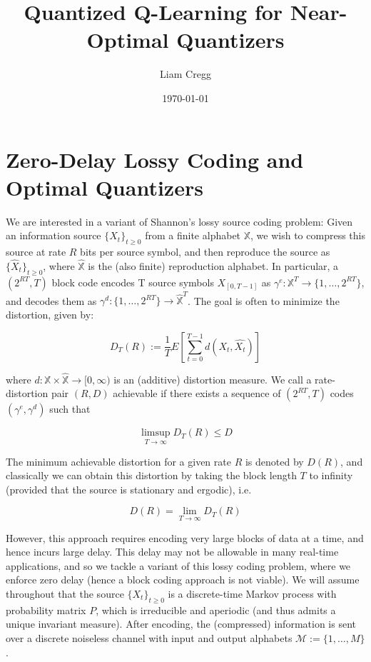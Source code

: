 \documentclass{article}
\title{Quantized Q-Learning for Near-Optimal Quantizers}
\date{\today}
\author{Liam Cregg}
\begin{document}
\begin{titlepage}
    \maketitle
\end{titlepage}

\newpage

\section{Zero-Delay Lossy Coding and Optimal Quantizers}\label{section:optimal quantizers}
We are interested in a variant of Shannon's lossy source coding problem: Given an information source \( \{X_t\}_{t\ge0} \) from a finite alphabet \( \mathbb{X} \), we wish to compress this source at rate \(R\) bits per source symbol, and then reproduce the source as \( \{\hat{X}_t\}_{t\ge0} \), where \(\hat{\mathbb{X}}\) is the (also finite) reproduction alphabet. In particular, a \((2^{RT},T)\) block code encodes T source symbols \(X_{[0,T-1]}\) as \(\gamma^e : \mathbb{X}^T \to \{1,\ldots,2^{RT}\} \), and decodes them as \( \gamma^d : \{1,\ldots,2^{RT}\} \to \hat{\mathbb{X}}^T \). The goal is often to minimize the distortion, given by:

\[ D_T(R) := \frac{1}{T} E[\sum_{t=0}^{T-1}d(X_t,\hat{X_t})]\]

\noindent where \(d : \mathbb{X} \times \hat{\mathbb{X}} \to [0,\infty)\) is an (additive) distortion measure. We call a rate-distortion pair \((R,D)\) achievable if there exists a sequence of \((2^{RT},T)\) codes \((\gamma^e,\gamma^d)\) such that

\[ \limsup_{T \to \infty}D_T(R) \le D\]

The minimum achievable distortion for a given rate \(R\) is denoted by \(D(R)\), and classically we can obtain this distortion by taking the block length \(T\) to infinity (provided that the source is stationary and ergodic), i.e.

\[D(R) = \lim_{T \to  \infty}D_T(R)\]

However, this approach requires encoding very large blocks of data at a time, and hence incurs large delay. This delay may not be allowable in many real-time applications, and so we tackle a variant of this lossy coding problem, where we enforce zero delay (hence a block coding approach is not viable). We will assume throughout that the source \( \{X_t\}_{t \ge 0} \) is a discrete-time Markov process with probability matrix \( P \), which is irreducible and aperiodic (and thus admits a unique invariant measure). After encoding, the (compressed) information is sent over a discrete noiseless channel with input and output alphabets \( \mathcal{M} := \{1,\ldots,M\} \).
\end{document}
